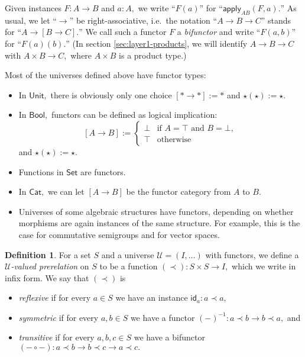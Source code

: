 \documentclass[a4paper]{article}
\theoremstyle{definition}
\newtheorem{definition}{Definition}[section]
\theoremstyle{remark}
\newcommand{\defn}{\emph}
\newcommand{\U}{\mathcal{U}}
\newcommand{\nm}{\mathsf}
\newcommand{\universe}{\nm}
\newcommand{\Unit}{\universe{Unit}}
\newcommand{\Bool}{\universe{Bool}}
\newcommand{\Set}{\universe{Set}}
\newcommand{\Cat}{\universe{Cat}}
\newcommand{\id}{\nm{id}}
\newcommand{\apply}{\nm{apply}}
\begin{document}
Given instances $F : A \to B$ and $a : A,$ we write ``$F(a)$'' for ``$\apply_{AB}(F,a).$''
As usual, we let ``$\to$'' be right-associative, i.e.\ the notation ``$A \to B \to C$'' stands for
``$A \to [B \to C].$'' We call such a functor $F$ a \defn{bifunctor} and write ``$F(a,b)$'' for
``$F(a)(b).$'' (In section \ref{sec:layer1-products}, we will identify $A \to B \to C$ with
$A \times B \to C,$ where $A \times B$ is a product type.)

Most of the universes defined above have functor types:
\begin{itemize}
  \item In $\Unit,$ there is obviously only one choice $[\ast \to \ast] := \ast$ and
  $\star(\star) := \star.$
  \item In $\Bool,$ functors can be defined as logical implication:
  \[[A \to B] := \begin{cases}
    \bot & \text{if } A = \top \text{ and } B = \bot,\\
    \top & \text{otherwise}
  \end{cases}\]
  and $\star(\star) := \star.$
  \item Functions in $\Set$ are functors.
  \item In $\Cat,$ we can let $[A \to B]$ be the functor category from $A$ to $B.$
  \item Universes of some algebraic structures have functors, depending on whether morphisms are
  again instances of the same structure. For example, this is the case for commutative semigroups
  and for vector spaces.
\end{itemize}

\begin{definition}
  For a set $S$ and a universe $\U = (I,\dots)$ with functors, we define a
  \defn{$\U$-valued prerelation} on $S$ to be a function $(\prec) : S \times S \to I,$ which we
  write in infix form.
  We say that $(\prec)$ is
  \begin{itemize}
    \item \defn{reflexive} if for every $a \in S$ we have an instance $\id_a : a \prec a,$
    \item \defn{symmetric} if for every $a,b \in S$ we have a functor
    $(-)^{-1} : a \prec b \to b \prec a,$ and
    \item \defn{transitive} if for every $a,b,c \in S$ we have a bifunctor
    $(- \circ -) : a \prec b \to b \prec c \to a \prec c.$
  \end{itemize}
\end{definition}
\end{document}
